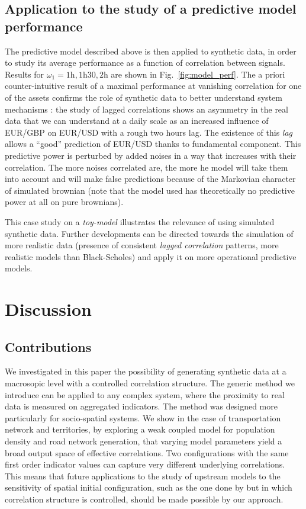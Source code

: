 \documentclass{article}
\begin{document}
\subsection*{Application to the study of a predictive model performance}


The predictive model described above is then applied to synthetic data, in order to study its average performance as a function of correlation between signals. Results for $\omega_1 = 1\textrm{h},1\textrm{h}30,2\textrm{h}$ are shown in Fig.~\ref{fig:model_perf}. The a priori counter-intuitive result of a maximal performance at vanishing correlation for one of the assets confirms the role of synthetic data to better understand system mechanisms : the study of lagged correlations shows an asymmetry in the real data that we can understand at a daily scale as an increased influence of EUR/GBP on EUR/USD with a rough two hours lag. The existence of this \emph{lag} allows a ``good'' prediction of EUR/USD thanks to fundamental component. This predictive power is perturbed by added noises in a way that increases with their correlation. The more noises correlated are, the more he model will take them into account and will make false predictions because of the Markovian character of simulated brownian (note that the model used has theoretically no predictive power at all on pure brownians).


This case study on a \emph{toy-model} illustrates the relevance of using simulated synthetic data. Further developments can be directed towards the simulation of more realistic data (presence of consistent \emph{lagged correlation} patterns, more realistic models than Black-Scholes) and apply it on more operational predictive models.






\section*{Discussion}


\subsection*{Contributions}

We investigated in this paper the possibility of generating synthetic data at a macrosopic level with a controlled correlation structure. The generic method we introduce can be applied to any complex system, where the proximity to real data is measured on aggregated indicators. The method was designed more particularly for socio-spatial systems. We show in the case of transportation network and territories, by exploring a weak coupled model for population density and road network generation, that varying model parameters yield a broad output space of effective correlations. Two configurations with the same first order indicator values can capture very different underlying correlations. This means that future applications to the study of upstream models to the sensitivity of spatial initial configuration, such as the one done by \cite{raimbault2018space} but in which correlation structure is controlled, should be made possible by our approach.
\end{document}
